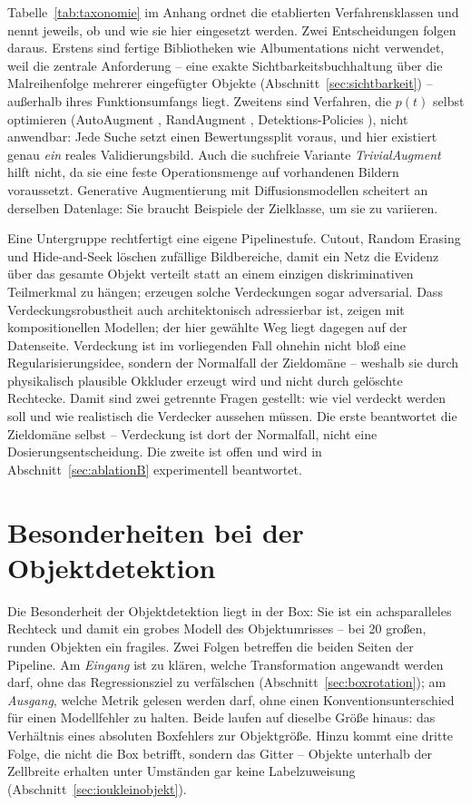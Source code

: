 Tabelle~\ref{tab:taxonomie} im Anhang ordnet die etablierten Verfahrensklassen
und nennt jeweils, ob und wie sie hier eingesetzt werden. Zwei Entscheidungen
folgen daraus. Erstens sind fertige Bibliotheken wie Albumentations
\parencite{buslaev2020} nicht verwendet, weil die zentrale Anforderung -- eine
exakte Sichtbarkeitsbuchhaltung über die Malreihenfolge mehrerer eingefügter
Objekte (Abschnitt~\ref{sec:sichtbarkeit}) -- außerhalb ihres Funktionsumfangs
liegt. Zweitens sind Verfahren, die $p(t)$ selbst optimieren (AutoAugment
\parencite{cubuk2019}, RandAugment \parencite{cubuk2020}, Detektions-Policies
\parencite{zoph2020}), nicht anwendbar: Jede Suche setzt einen Bewertungssplit
voraus, und hier existiert genau \emph{ein} reales Validierungsbild. Auch die
suchfreie Variante \emph{TrivialAugment} \parencite{mueller2021} hilft nicht, da
sie eine feste Operationsmenge auf vorhandenen Bildern voraussetzt. Generative
Augmentierung mit Diffusionsmodellen \parencite{trabucco2024} scheitert an
derselben Datenlage: Sie braucht Beispiele der Zielklasse, um sie zu variieren.

Eine Untergruppe rechtfertigt eine eigene Pipelinestufe. Cutout, Random Erasing
und Hide-and-Seek löschen zufällige Bildbereiche, damit ein Netz die Evidenz über
das gesamte Objekt verteilt statt an einem einzigen diskriminativen Teilmerkmal
zu hängen; \textcite{wang2017afastrcnn} erzeugen solche Verdeckungen sogar
adversarial. Dass Verdeckungsrobustheit auch architektonisch adressierbar ist, zeigen
\textcite{kortylewski2020} mit kompositionellen Modellen; der hier gewählte Weg
liegt dagegen auf der Datenseite. Verdeckung ist im vorliegenden Fall
ohnehin nicht bloß eine Regularisierungsidee, sondern der Normalfall der
Zieldomäne -- weshalb sie durch physikalisch plausible Okkluder erzeugt wird und
nicht durch gelöschte Rechtecke. Damit sind zwei getrennte Fragen gestellt: wie viel
verdeckt werden soll und wie realistisch die Verdecker aussehen müssen. Die
erste beantwortet die Zieldomäne selbst -- Verdeckung ist dort der Normalfall,
nicht eine Dosierungsentscheidung. Die zweite ist offen und wird in
Abschnitt~\ref{sec:ablationB} experimentell beantwortet.

\section{Besonderheiten bei der Objektdetektion}
\label{sec:augdetektion}

Die Besonderheit der Objektdetektion liegt in der Box: Sie ist ein achsparalleles
Rechteck und damit ein grobes Modell des Objektumrisses -- bei 20\px{} großen,
runden Objekten ein fragiles. Zwei Folgen betreffen die beiden Seiten der
Pipeline. Am \emph{Eingang} ist zu klären, welche Transformation angewandt werden
darf, ohne das Regressionsziel zu verfälschen
(Abschnitt~\ref{sec:boxrotation}); am \emph{Ausgang}, welche Metrik gelesen
werden darf, ohne einen Konventionsunterschied für einen Modellfehler zu halten.
Beide laufen auf dieselbe Größe hinaus: das Verhältnis eines absoluten
Boxfehlers zur Objektgröße. Hinzu kommt eine dritte Folge, die nicht die Box
betrifft, sondern das Gitter -- Objekte unterhalb der Zellbreite erhalten unter
Umständen gar keine Labelzuweisung (Abschnitt~\ref{sec:ioukleinobjekt}).

